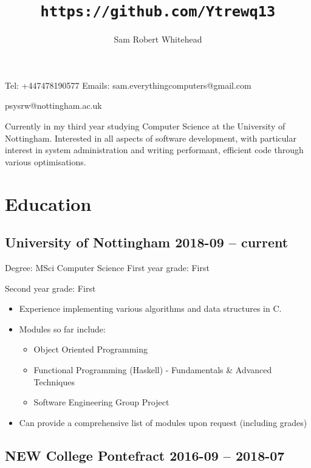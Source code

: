 \documentclass[10pt]{extarticle}
\renewcommand{\maketitle}{\begin{center}\huge\bfseries\theauthor\end{center}\begin{center}\Large\thetitle\end{center}}
\begin{document}
    \title{\texttt{https://github.com/Ytrewq13}}
    \author{Sam Robert Whitehead}

    \maketitle

    \pagestyle{empty}

    Tel: +447478190577
    \hfill
    Emails: sam.everythingcomputers@gmail.com\\
    {\raggedleft psysrw@nottingham.ac.uk\par}
    \vspace{1mm}
    Currently in my third year studying Computer Science at the University of
    Nottingham. Interested in all aspects of software development, with
    particular interest in system administration and writing performant,
    efficient code through various optimisations.
    \section{Education}
    \subsection{University of Nottingham
    \hfill 2018-09 -- current}
    Degree: MSci Computer Science
    \hfill
    First year grade: First\\
    {\raggedleft Second year grade: First\par}
    \begin{itemize}
        \item Experience implementing various algorithms and data structures in
            C.
        \item Modules so far include:
            \begin{itemize}
                \item Object Oriented Programming
                \item Functional Programming (Haskell) - Fundamentals \&
                    Advanced Techniques
                \item Software Engineering Group Project
            \end{itemize}
        \item Can provide a comprehensive list of modules upon request
            (including grades)
    \end{itemize}
    \subsection{NEW College Pontefract
    \hfill 2016-09 -- 2018-07}
\end{document}
